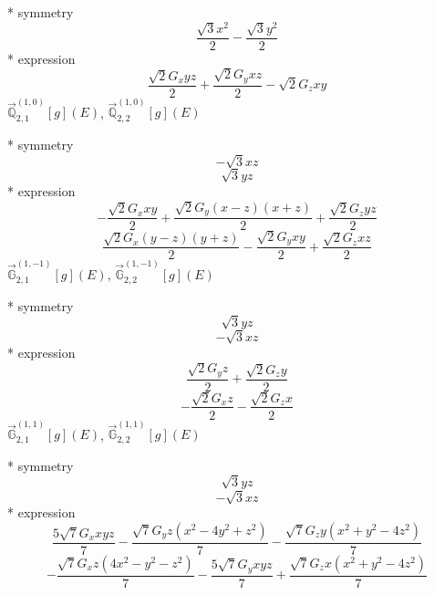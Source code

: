\documentclass[fleqn,8pt]{jsarticle}
\begin{document}
\noindent\quad ** symmetry
\begin{dmath*}
\frac{\sqrt{3} x^{2}}{2} - \frac{\sqrt{3} y^{2}}{2}
\end{dmath*}
\noindent\quad ** expression
\begin{dmath*}
\frac{\sqrt{2} G_{x} y z}{2} + \frac{\sqrt{2} G_{y} x z}{2} - \sqrt{2} G_{z} x y
\end{dmath*}
\noindent\quad $\vec{\mathbb{Q}}_{2,1}^{(1,0)}[g](E)$, $\vec{\mathbb{Q}}_{2,2}^{(1,0)}[g](E)$

\noindent\quad ** symmetry
\begin{dmath*}
- \sqrt{3} x z
\end{dmath*}
\begin{dmath*}
\sqrt{3} y z
\end{dmath*}
\noindent\quad ** expression
\begin{dmath*}
- \frac{\sqrt{2} G_{x} x y}{2} + \frac{\sqrt{2} G_{y} \left(x - z\right) \left(x + z\right)}{2} + \frac{\sqrt{2} G_{z} y z}{2}
\end{dmath*}
\begin{dmath*}
\frac{\sqrt{2} G_{x} \left(y - z\right) \left(y + z\right)}{2} - \frac{\sqrt{2} G_{y} x y}{2} + \frac{\sqrt{2} G_{z} x z}{2}
\end{dmath*}
\noindent\quad $\vec{\mathbb{G}}_{2,1}^{(1,-1)}[g](E)$, $\vec{\mathbb{G}}_{2,2}^{(1,-1)}[g](E)$

\noindent\quad ** symmetry
\begin{dmath*}
\sqrt{3} y z
\end{dmath*}
\begin{dmath*}
- \sqrt{3} x z
\end{dmath*}
\noindent\quad ** expression
\begin{dmath*}
\frac{\sqrt{2} G_{y} z}{2} + \frac{\sqrt{2} G_{z} y}{2}
\end{dmath*}
\begin{dmath*}
- \frac{\sqrt{2} G_{x} z}{2} - \frac{\sqrt{2} G_{z} x}{2}
\end{dmath*}
\noindent\quad $\vec{\mathbb{G}}_{2,1}^{(1,1)}[g](E)$, $\vec{\mathbb{G}}_{2,2}^{(1,1)}[g](E)$

\noindent\quad ** symmetry
\begin{dmath*}
\sqrt{3} y z
\end{dmath*}
\begin{dmath*}
- \sqrt{3} x z
\end{dmath*}
\noindent\quad ** expression
\begin{dmath*}
\frac{5 \sqrt{7} G_{x} x y z}{7} - \frac{\sqrt{7} G_{y} z \left(x^{2} - 4 y^{2} + z^{2}\right)}{7} - \frac{\sqrt{7} G_{z} y \left(x^{2} + y^{2} - 4 z^{2}\right)}{7}
\end{dmath*}
\begin{dmath*}
- \frac{\sqrt{7} G_{x} z \left(4 x^{2} - y^{2} - z^{2}\right)}{7} - \frac{5 \sqrt{7} G_{y} x y z}{7} + \frac{\sqrt{7} G_{z} x \left(x^{2} + y^{2} - 4 z^{2}\right)}{7}
\end{dmath*}
\end{document}
